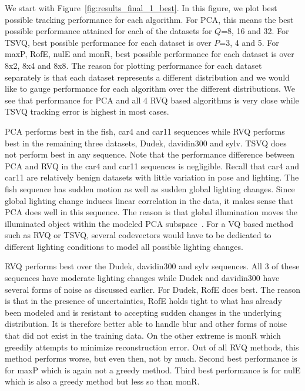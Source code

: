 We start with Figure~\ref{fig:results_final_1_best}.  In this figure, we plot best possible tracking performance for each algorithm.  For PCA, this means the best possible performance attained for each of the datasets for $Q$=8, 16 and 32.  For TSVQ, best possible performance for each dataset is over $P$=3, 4 and 5.  For maxP, RofE, nulE and monR, best possible performance for each dataset is over 8x2, 8x4 and 8x8.  The reason for plotting performance for each dataset separately is that each dataset represents a different distribution and we would like to gauge performance for each algorithm over the different distributions.  We see that performance for PCA and all 4 RVQ based algorithms is very close while TSVQ tracking error is highest in most cases.  

PCA performs best in the fish, car4 and car11 sequences while RVQ performs best in the remaining three datasets, Dudek, davidin300 and sylv.  TSVQ does not perform best in any sequence.  Note that the performance difference between PCA and RVQ in the car4 and car11 sequences is negligible.  Recall that car4 and car11 are relatively benign datasets with little variation in pose and lighting.  The fish sequence has sudden motion as well as sudden global lighting changes.   Since global lighting change induces linear correlation in the data, it makes sense that PCA does well in this sequence.  The reason is that global illumination moves the illuminated object within the modeled PCA subspace~\cite{1987_JNL_Faces_Sirovich}.  For a VQ based method such as RVQ or TSVQ, several codevectors would have to be dedicated to different lighting conditions to model all possible lighting changes.  

RVQ performs best over the Dudek, davidin300 and sylv sequences.  All 3 of these sequences have moderate lighting changes while Dudek and davidin300 have several forms of noise as discussed earlier.  For Dudek, RofE does best.  The reason is that in the presence of uncertainties, RofE holds tight to what has already been modeled and is resistant to accepting sudden changes in the underlying distribution.  It is therefore better able to handle blur and other forms of noise that did not exist in the training data.  On the other extreme is monR which greedily attempts to minimize reconstruction error.  Out of all RVQ methods, this method performs worse, but even then, not by much.  Second best performance is for maxP which is again not a greedy method.  Third best performance is for nulE which is also a greedy method but less so than monR.

